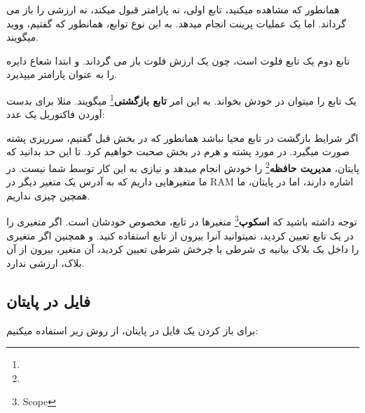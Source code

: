 \documentclass[14pt,a4paper]{memoir}
\begin{document}
	 
همانطور که مشاهده میکنید، تابع اولی، نه پارامتر قبول میکند، نه ارزشی را باز می گرداند. اما یک عملیات پرینت انجام میدهد. به این نوع توابع، همانطور که گفتیم، ووید میگویند.

تابع دوم یک تابع فلوت است، چون یک ارزش فلوت باز می گرداند. و ابتدا شعاع دایره را به عنوان پارامتر میپذیرد.

یک تابع را میتوان در خودش بخواند. به این امر \textbf{تابع بازگشتی}\footnote{} میگویند. مثلا برای بدست آوردن فاکتوریل یک عدد:



	 
	 
	 \begin{latin}
	
\end{latin}
	 
	 
	 اگر شرایط بازگشت در تابع محیا نباشد همانطور که در بخش قبل گفتیم، سرریزی پشته صورت میگیرد. در مورد پشته و هرم در بخش  صحبت خواهیم کرد. تا این حد بدانید که پایتان، \textbf{مدیریت حافظه}\footnote{} را خودش انجام میدهد و نیازی به این کار توسط شما نیست. در  ما متغیرهایی داریم که به آدرس یک متغیر دیگر در RAM اشاره دارند، اما در پایتان، ما همچین چیزی نداریم.
	 
	 \begin{tip}
	 	توجه داشته باشید که \textbf{اسکوپ}\footnote{Scope} متغیرها در تابع، مخصوص خودشان است. اگر متغیری را در یک تابع تعیین کردید، نمیتوانید آنرا بیرون از تابع استفاده کنید. و همچنین اگر متغیری را داخل یک بلاک بیانیه ی شرطی یا چرخش شرطی تعیین کردید، آن متغیر، بیرون از آن بلاک، ارزشی ندارد.
	 \end{tip}	 
	 
	 
	 \subsection{فایل در پایتان}\label{pyfile}
	 برای باز کردن یک فایل در پایتان، از روش زیر استفاده میکنیم:
	 
	 
	 
	 	 \begin{latin}
	 	
	 \end{latin}
 
\end{document}

